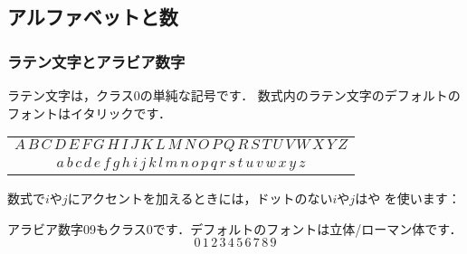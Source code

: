 

\subsection{アルファベットと数}\label{alpha-digit}

\subsubsection{ラテン文字とアラビア数字}
ラテン文字は，クラス0の単純な記号です．
数式内のラテン文字のデフォルトのフォントはイタリックです．

\begin{center}
\begin{tabular}{c}
  $A\,B\,C\,D\,E\,F\,G\,H\,I\,J\,K\,L\,M%
   \,N\,O\,P\,Q\,R\,S\,T\,U\,V\,W\,X\,Y\,Z$\\
  $a\,b\,c\,d\,e\,f\,g\,h\,i\,j\,k\,l\,m%
   \,n\,o\,p\,q\,r\,s\,t\,u\,v\,w\,x\,y\,z$
\end{tabular}
\end{center}
数式で$i$や$j$にアクセントを加えるときには，ドットのない$i$や$j$はや
を使います：
\begin{symlist}
\symbox{\hat{\jmath}}{\string\hat\string{\string\jmath\string}}
\end{symlist}

アラビア数字0\ndash 9もクラス0です．デフォルトのフォントは立体/ローマン体です．
\[0\,1\,2\,3\,4\,5\,6\,7\,8\,9\]


